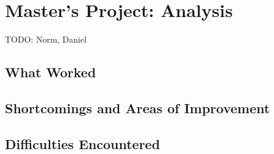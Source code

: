 \section{Master's Project: Analysis}
TODO: Norm, Daniel
\subsection{What Worked}

\subsection{Shortcomings and Areas of Improvement}

\subsection{Difficulties Encountered}

\newpage